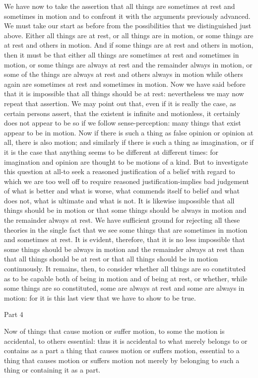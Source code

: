 We have now to take the assertion that all things are sometimes at
rest and sometimes in motion and to confront it with the arguments
previously advanced. We must take our start as before from the possibilities
that we distinguished just above. Either all things are at rest, or
all things are in motion, or some things are at rest and others in
motion. And if some things are at rest and others in motion, then
it must be that either all things are sometimes at rest and sometimes
in motion, or some things are always at rest and the remainder always
in motion, or some of the things are always at rest and others always
in motion while others again are sometimes at rest and sometimes in
motion. Now we have said before that it is impossible that all things
should be at rest: nevertheless we may now repeat that assertion.
We may point out that, even if it is really the case, as certain persons
assert, that the existent is infinite and motionless, it certainly
does not appear to be so if we follow sense-perception: many things
that exist appear to be in motion. Now if there is such a thing as
false opinion or opinion at all, there is also motion; and similarly
if there is such a thing as imagination, or if it is the case that
anything seems to be different at different times: for imagination
and opinion are thought to be motions of a kind. But to investigate
this question at all-to seek a reasoned justification of a belief
with regard to which we are too well off to require reasoned justification-implies
bad judgement of what is better and what is worse, what commends itself
to belief and what does not, what is ultimate and what is not. It
is likewise impossible that all things should be in motion or that
some things should be always in motion and the remainder always at
rest. We have sufficient ground for rejecting all these theories in
the single fact that we see some things that are sometimes in motion
and sometimes at rest. It is evident, therefore, that it is no less
impossible that some things should be always in motion and the remainder
always at rest than that all things should be at rest or that all
things should be in motion continuously. It remains, then, to consider
whether all things are so constituted as to be capable both of being
in motion and of being at rest, or whether, while some things are
so constituted, some are always at rest and some are always in motion:
for it is this last view that we have to show to be true.

Part 4

Now of things that cause motion or suffer motion, to some the motion
is accidental, to others essential: thus it is accidental to what
merely belongs to or contains as a part a thing that causes motion
or suffers motion, essential to a thing that causes motion or suffers
motion not merely by belonging to such a thing or containing it as
a part. 

